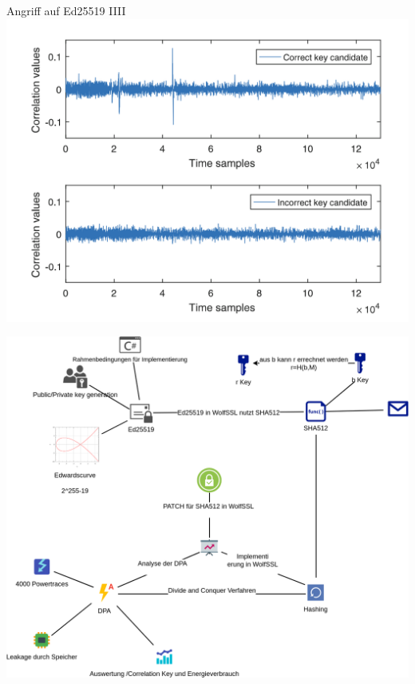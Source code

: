 \documentclass[
  10pt,
  ignorenonframetext,
  aspectratio=43,
]{beamer}
\begin{document}
\begin{frame}{Angriff auf Ed25519 IIII}
\protect\hypertarget{angriff-auf-ed25519-iiii}{}
\includegraphics[width=\textwidth,height=0.95\textheight]{Abbildungen/cvDPA.png}
\end{frame}

\begin{frame}{}
\protect\hypertarget{section-23}{}
\includegraphics{Abbildungen/ITSEC(1)_res.png}
\end{frame}
\end{document}
